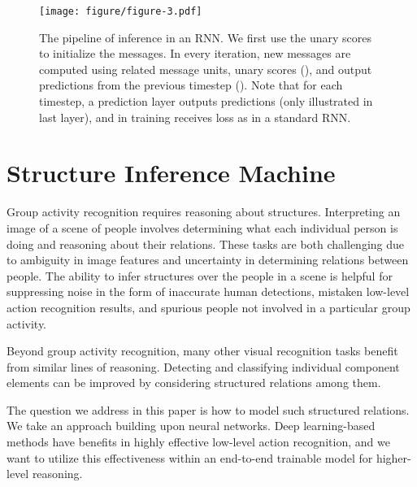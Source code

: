 \documentclass[10pt,twocolumn,letterpaper]{article}
\begin{document}
\begin{figure*}[t!]
\begin{center}
  \texttt{[image: figure/figure-3.pdf]}
\end{center}
\caption{The pipeline of inference in an RNN. We first use the unary scores to initialize the messages. In every iteration, new messages are computed using related message units, unary scores (), and output predictions from the previous timestep (). Note that for each timestep, a prediction layer outputs predictions (only illustrated in last layer), and in training receives loss as in a standard RNN.}
\label{fig:pipeline}
\vspace{-4mm}
\end{figure*}



\section{Structure Inference Machine}
\vspace{-1.5mm}

Group activity recognition requires reasoning about structures.  Interpreting an image of a scene of people involves determining what each individual person is doing and reasoning about their relations.  These tasks are both challenging due to ambiguity in image features and uncertainty in determining relations between people.  The ability to infer structures over the people in a scene is helpful for suppressing noise in the form of inaccurate human detections, mistaken low-level action recognition results, and spurious people not involved in a particular group activity.

Beyond group activity recognition, many other visual recognition tasks benefit from similar lines of reasoning.  Detecting and classifying individual component elements can be improved by considering structured relations among them.

The question we address in this paper is how to model such structured relations.  We take an approach building upon neural networks.  Deep learning-based methods have benefits in highly effective low-level action recognition, and we want to utilize this effectiveness within an end-to-end trainable model for higher-level reasoning.
\end{document}
